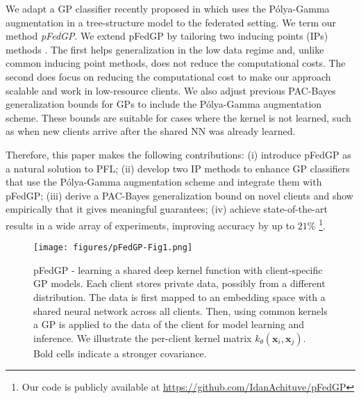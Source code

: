 \documentclass{article}
\def\rvx{{\mathbf{x}}}
\newcommand{\pg}{P\'olya-Gamma }
\begin{document}
We adapt a GP classifier recently proposed in \cite{achituve2021gp_icml} which uses the \pg augmentation \cite{polya_gamma} in a tree-structure model to the federated setting. We term our method \textit{pFedGP}. We extend pFedGP by tailoring two inducing points (IPs) methods \cite{quinonero2005unifying, sneldon_Gharamani_IP}. The first helps generalization in the low data regime and, unlike common inducing point methods, does not reduce the computational costs. The second does focus on reducing the computational cost to make our approach scalable and work in low-resource clients. We also adjust previous PAC-Bayes generalization bounds for GPs \cite{reeb2018learning, seeger2002pac} to include the \pg augmentation scheme. These bounds are suitable for cases where the kernel is not learned, such as when new clients arrive after the shared NN was already learned.

Therefore, this paper makes the following contributions: (i) introduce pFedGP as a natural solution to PFL; (ii) develop two IP methods to enhance GP classifiers that use the \pg augmentation scheme and integrate them with pFedGP; (iii) derive a PAC-Bayes generalization bound on novel clients and show empirically that it gives meaningful guarantees; (iv) achieve state-of-the-art results in a wide array of experiments, improving accuracy by up to $21\%$ \footnote{Our code is publicly available at \textcolor{magenta}{\url{https://github.com/IdanAchituve/pFedGP}}}.



\begin{figure*}[!t]
\centering
    \texttt{[image: figures/pFedGP-Fig1.png]}
    \caption{pFedGP - learning a shared deep kernel function with client-specific GP models. Each client stores private data, possibly from a different distribution. The data is first mapped to an embedding space with a shared neural network across all clients. Then, using common kernels a GP is applied to the data of the client for model learning and inference. We illustrate the per-client kernel matrix $k_\theta(\rvx_i,\rvx_j)$. Bold cells indicate a stronger covariance.}
    \label{fig:gp_sys}
\end{figure*}
\end{document}
